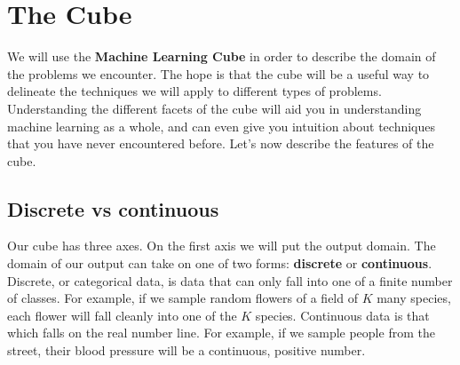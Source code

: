 



\section{The Cube}
We will use the \textbf{Machine Learning Cube} in order to describe the domain of the problems we encounter. The hope is that the cube will be a useful way to delineate the techniques we will apply to different types of problems. Understanding the different facets of the cube will aid you in understanding machine learning as a whole, and can even give you intuition about techniques that you have never encountered before. Let's now describe the features of the cube.

\subsection{Discrete vs continuous}

Our cube has three axes. On the first axis we will put the output domain. The domain of our output can take on one of two forms: \textbf{discrete} or \textbf{continuous}. Discrete, or categorical data, is data that can only fall into one of a finite number of classes. For example, if we sample random flowers of a field of $K$ many species, each flower will fall cleanly into one of the $K$ species. Continuous data is that which falls on the real number line. For example, if we sample people from the street, their blood pressure will be a continuous, positive number.

